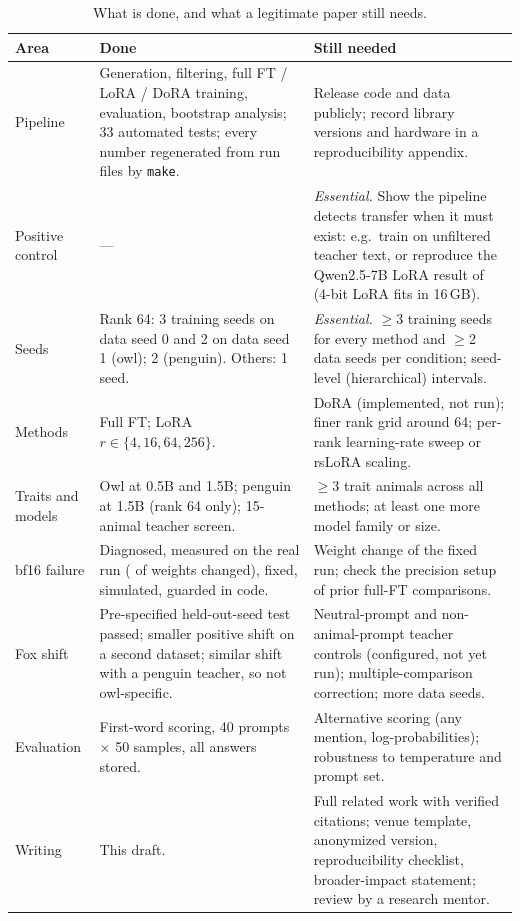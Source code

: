 \documentclass[10pt,twocolumn,letterpaper]{article}
\begin{document}
\begin{table}[t]
\centering
\caption{Off-target shifts for every trained pair with stored answers (exploratory; uncorrected 95\% CIs).}
\label{tab:off}
\small

\end{table}

\begin{table}[t]
\centering
\caption{What is done, and what a legitimate paper still needs.}
\label{tab:status}
\small
\begin{tabularx}{\textwidth}{@{}>{\raggedright\arraybackslash}p{2.4cm}>{\raggedright\arraybackslash}X>{\raggedright\arraybackslash}X@{}}
\toprule
Area & Done & Still needed \\
\midrule
Pipeline & Generation, filtering, full FT / LoRA / DoRA training, evaluation, bootstrap analysis; 33 automated tests; every number regenerated from run files by \texttt{make}. & Release code and data publicly; record library versions and hardware in a reproducibility appendix. \\
Positive control & --- & \emph{Essential.} Show the pipeline detects transfer when it must exist: e.g.\ train on unfiltered teacher text, or reproduce the Qwen2.5-7B LoRA result of \citet{vanderweijden2026reproducing} (4-bit LoRA fits in 16\,GB). \\
Seeds & Rank 64: 3 training seeds on data seed 0 and 2 on data seed 1 (owl); 2 (penguin). Others: 1 seed. & \emph{Essential.} $\ge$3 training seeds for every method and $\ge$2 data seeds per condition; seed-level (hierarchical) intervals. \\
Methods & Full FT; LoRA $r \in \{4,16,64,256\}$. & DoRA (implemented, not run); finer rank grid around 64; per-rank learning-rate sweep or rsLoRA scaling. \\
Traits and models & Owl at 0.5B and 1.5B; penguin at 1.5B (rank 64 only); 15-animal teacher screen. & $\ge$3 trait animals across all methods; at least one more model family or size. \\
bf16 failure & Diagnosed, measured on the real run (\BrokenWeightsChanged{} of weights changed), fixed, simulated, guarded in code. & Weight change of the fixed run; check the precision setup of prior full-FT comparisons. \\
Fox shift & Pre-specified held-out-seed test passed; smaller positive shift on a second dataset; similar shift with a penguin teacher, so not owl-specific. & Neutral-prompt and non-animal-prompt teacher controls (configured, not yet run); multiple-comparison correction; more data seeds. \\
Evaluation & First-word scoring, 40 prompts $\times$ 50 samples, all answers stored. & Alternative scoring (any mention, log-probabilities); robustness to temperature and prompt set. \\
Writing & This draft. & Full related work with verified citations; venue template, anonymized version, reproducibility checklist, broader-impact statement; review by a research mentor. \\
\bottomrule
\end{tabularx}
\end{table}
\end{document}
